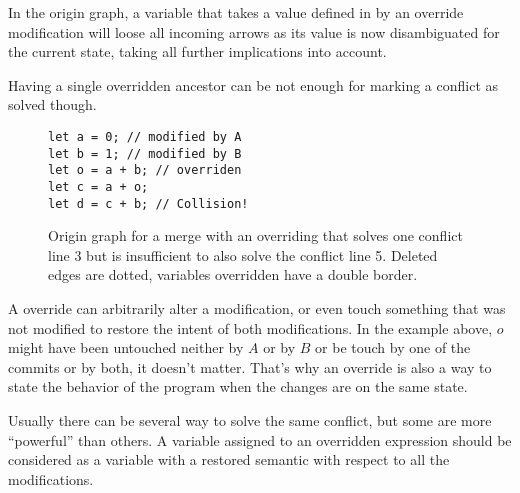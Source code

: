 \documentclass[a4paper,10pt]{article}
\begin{document}
In the origin graph, a variable that takes a value defined in by an override modification will loose all incoming arrows as its value is now disambiguated for the current state, taking all further implications into account.

Having a single overridden ancestor can be not enough for marking a conflict as solved though.

\begin{figure}[ht]
\begin{minipage}{.5\textwidth}
\begin{lstlisting}
let a = 0; // modified by A
let b = 1; // modified by B
let o = a + b; // overriden
let c = a + o;
let d = c + b; // Collision!
\end{lstlisting}
\end{minipage}\hfill
\begin{minipage}{.45\textwidth}
\centering{}
\end{minipage}
\caption{Origin graph for a merge with an overriding that solves one conflict line 3 but is insufficient to also solve the conflict line 5. Deleted edges are dotted, variables overridden have a double border.}
\end{figure}

A override can arbitrarily alter a modification, or even touch something that was not modified to restore the intent of both modifications. In the example above, $o$ might have been untouched neither by $A$ or by $B$ or be touch by one of the commits or by both, it doesn't matter. That's why an override is also a way to state the behavior of the program when the changes are on the same state.

Usually there can be several way to solve the same conflict, but some are more ``powerful'' than others. A variable assigned to an overridden expression should be considered as a variable with a restored semantic with respect to all the modifications.
\end{document}
